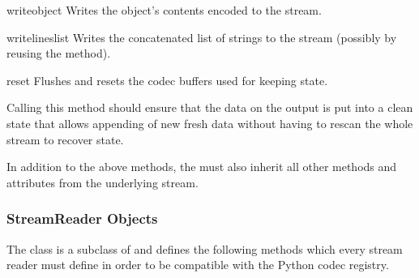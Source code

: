 \begin{methoddesc}{write}{object}
  Writes the object's contents encoded to the stream.
\end{methoddesc}

\begin{methoddesc}{writelines}{list}
  Writes the concatenated list of strings to the stream (possibly by
  reusing the  method).
\end{methoddesc}

\begin{methoddesc}{reset}{}
  Flushes and resets the codec buffers used for keeping state.

  Calling this method should ensure that the data on the output is put
  into a clean state that allows appending of new fresh data without
  having to rescan the whole stream to recover state.
\end{methoddesc}

In addition to the above methods, the  must also
inherit all other methods and attributes from the underlying stream.


\subsubsection{StreamReader Objects \label{stream-reader-objects}}

The  class is a subclass of  and
defines the following methods which every stream reader must define in
order to be compatible with the Python codec registry.

